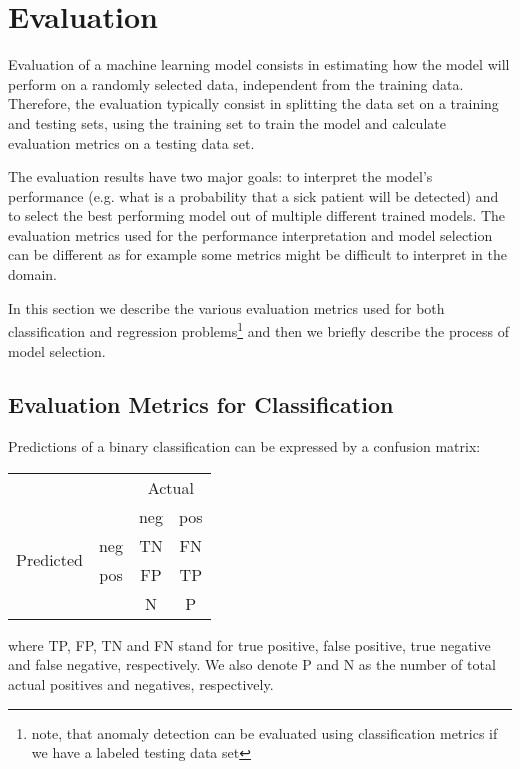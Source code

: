 \section{Evaluation}
\label{sec:ml_evaluation}

Evaluation of a machine learning model consists in estimating how the model will perform on a randomly selected data, independent from the training data.
Therefore, the evaluation typically consist in splitting the data set on a training and testing sets, using the training set to train the model and calculate evaluation metrics on a testing data set.

The evaluation results have two major goals: to interpret the model's performance (e.g. what is a probability that a sick patient will be detected) and to select the best performing model out of multiple different trained models.
The evaluation metrics used for the performance interpretation and model selection can be different as for example some metrics might be difficult to interpret in the domain.

In this section we describe the various evaluation metrics used for both classification and regression problems\footnote{note, that anomaly detection can be evaluated using classification metrics if we have a labeled testing data set} and then we briefly describe the process of model selection.

\subsection{Evaluation Metrics for Classification}

Predictions of a binary classification can be expressed by a confusion matrix:
\begin{center}
    \begin{tabular}{cc|cc|}
    \multicolumn{1}{c}{} & \multicolumn{1}{c|}{} &\multicolumn{2}{c|}{Actual} \\ 
    \multicolumn{1}{c}{} & \multicolumn{1}{c|}{} &
    \multicolumn{1}{c}{neg} & \multicolumn{1}{c|}{pos} \\ \hline
    \multirow{2}{*}{{Predicted}}
    & neg  & TN & FN   \\ 
    & pos  & FP   & TP \\ \hline
    & \multicolumn{1}{c}{} & \multicolumn{1}{c}{N} & \multicolumn{1}{c}{P} \\
    \end{tabular}
\end{center}
where TP, FP, TN and FN stand for true positive, false positive, true negative and false negative, respectively.
We also denote P and N as the number of total actual positives and negatives, respectively.

